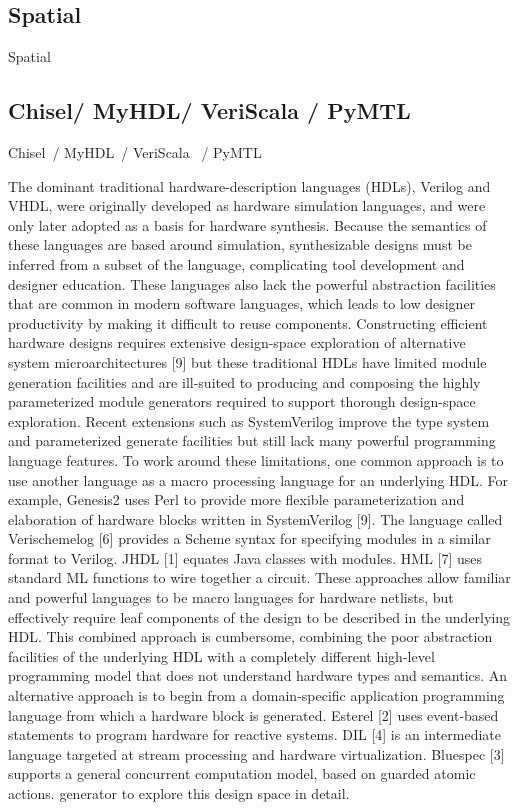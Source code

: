 \subsection{Spatial}
Spatial~\cite{david_PLDI_2018_spatial, prabhakar_asplos_2016_parallelpattern}


\subsection{Chisel/ MyHDL/ VeriScala / PyMTL}
Chisel~\cite{chisel}/ MyHDL~\cite{decaluwe_2004_myhdl}/ VeriScala~\cite{liu_2017_scala} / PyMTL~\cite{lockhart_ISCA_2014_pymtl}
%

The dominant traditional hardware-description languages
(HDLs), Verilog and VHDL, were originally developed as
hardware simulation languages, and were only later adopted
as a basis for hardware synthesis. Because the semantics of
these languages are based around simulation, synthesizable
designs must be inferred from a subset of the language, complicating tool development and designer education. These
languages also lack the powerful abstraction facilities that
are common in modern software languages, which leads to
low designer productivity by making it difficult to reuse components. Constructing efficient hardware designs requires
extensive design-space exploration of alternative system microarchitectures [9] but these traditional HDLs have limited
module generation facilities and are ill-suited to producing
and composing the highly parameterized module generators
required to support thorough design-space exploration. Recent extensions such as SystemVerilog improve the type system and parameterized generate facilities but still lack many
powerful programming language features.
To work around these limitations, one common approach
is to use another language as a macro processing language
for an underlying HDL. For example, Genesis2 uses Perl to
provide more flexible parameterization and elaboration of
hardware blocks written in SystemVerilog [9]. The language
called Verischemelog [6] provides a Scheme syntax for specifying modules in a similar format to Verilog. JHDL [1]
equates Java classes with modules. HML [7] uses standard
ML functions to wire together a circuit. These approaches
allow familiar and powerful languages to be macro languages
for hardware netlists, but effectively require leaf components
of the design to be described in the underlying HDL. This
combined approach is cumbersome, combining the poor abstraction facilities of the underlying HDL with a completely
different high-level programming model that does not understand hardware types and semantics.
An alternative approach is to begin from a domain-specific
application programming language from which a hardware
block is generated. Esterel [2] uses event-based statements
to program hardware for reactive systems. DIL [4] is an intermediate language targeted at stream processing and hardware virtualization. Bluespec [3] supports a general concurrent computation model, based on guarded atomic actions.
generator to explore this design space in detail.


